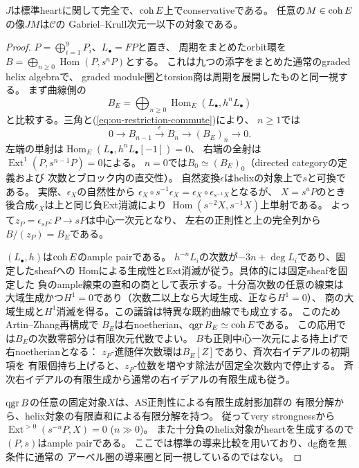\begin{lemma}[曲線のheartと次元]\label{lem:ou-elliptic-heart}
$J$は標準heartに関して完全で、$\operatorname{coh} E$上でconservativeである。
任意の$M\in\operatorname{coh} E$の像$JM$は$\mathcal C$の
Gabriel--Krull次元一以下の対象である。
\end{lemma}
\begin{proof}
$P=\bigoplus_{i=1}^9P_i$、$L_\bullet=FP$と置き、
周期をまとめたorbit環を
$B=\bigoplus_{n\geq0}\operatorname{Hom}(P,s^nP)$とする。
これは九つの添字をまとめた通常のgraded helix algebraで、
graded module圏とtorsion商は周期を展開したものと同一視する。
まず曲線側の
\[
 B_E=\bigoplus_{n\geq0}\operatorname{Hom}_E(L_\bullet,h^nL_\bullet)
\]
と比較する。三角と(\ref{eq:ou-restriction-commute})により、
$n\geq1$では
\[
 0\to B_{n-1}\xrightarrow{\epsilon} B_n\to (B_E)_n\to0.
\]
左端の単射は$\operatorname{Hom}_E(L_\bullet,h^nL_\bullet[-1])=0$、
右端の全射は$\operatorname{Ext}^1(P,s^{n-1}P)=0$による。
$n=0$では$B_0\simeq (B_E)_0$（directed categoryの定義および
次数とブロック内の直交性）。
自然変換$\epsilon$はhelixの対象上で$s$と可換である。
実際、$\epsilon_X$の自然性から
$\epsilon_X\circ s^{-1}\epsilon_X
 =\epsilon_X\circ\epsilon_{s^{-1}X}$となるが、
$X=s^aP$のとき後合成$\epsilon_X$は上と同じ負Ext消滅により
$\operatorname{Hom}(s^{-2}X,s^{-1}X)$上単射である。
よって$z_P=\epsilon_{sP}:P\to sP$は中心一次元となり、
左右の正則性と上の完全列から$B/(z_P)=B_E$である。

$(L_\bullet,h)$は$\operatorname{coh} E$のample pairである。
$h^{-n}L_i$の次数が$-3n+\deg L_i$であり、固定したsheafへの
Homによる生成性とExt消滅が従う。具体的には固定sheafを固定した
負のample線束の直和の商として表示する。十分高次数の任意の線束は
大域生成かつ$H^1=0$であり（次数二以上なら大域生成、正なら$H^1=0$）、
商の大域生成と$H^1$消滅を得る。この議論は特異な既約曲線でも成立する。
このためArtin--Zhang再構成\cite[Theorem~4.5]{AZ1994}で
$B_E$は右noetherian、$\operatorname{qgr} B_E\simeq\operatorname{coh} E$である。
この応用では$B_E$の次数零部分は有限次元代数でよい。
$B$も正則中心一次元による持上げで右noetherianとなる：
$z_P$-進随伴次数環は$B_E[Z]$であり、斉次右イデアルの初期項を
有限個持ち上げると、$z_P$-位数を増やす除法が固定全次数内で停止する。
斉次右イデアルの有限生成から通常の右イデアルの有限生成も従う。

$\operatorname{qgr} B$の任意の固定対象$X$は、AS正則性による有限生成射影加群の
有限分解から、helix対象の有限直和による有限分解を持つ。
従ってvery strongnessから
$\operatorname{Ext}^{>0}(s^{-n}P,X)=0$ ($n\gg0$)。
また十分負のhelix対象がheartを生成するので
$(P,s)$はample pairである。
ここでは標準の導来比較を用いており、dg商を無条件に通常の
アーベル圏の導来圏と同一視しているのではない。


\end{proof}
